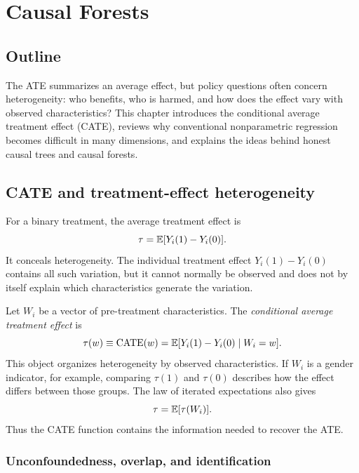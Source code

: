 \chapter{Causal Forests}
\label{chap:causal-forest}

\section*{Outline}

The ATE summarizes an average effect, but policy questions often concern
heterogeneity: who benefits, who is harmed, and how does the effect vary with
observed characteristics?  This chapter introduces the conditional average
treatment effect (CATE), reviews why conventional nonparametric regression becomes
difficult in many dimensions, and explains the ideas behind honest causal trees and
causal forests.

\section{CATE and treatment-effect heterogeneity}
\label{sec:cf-cate}

For a binary treatment, the average treatment effect is
\[
  \tau=\mathbb{E}[Y_i(1)-Y_i(0)].
\]
It conceals heterogeneity.  The individual treatment effect
$Y_i(1)-Y_i(0)$ contains all such variation, but it cannot normally be observed and
does not by itself explain which characteristics generate the variation.

Let $W_i$ be a vector of pre-treatment characteristics.  The
\emph{conditional average treatment effect} is
\begin{equation}
  \tau(w)\equiv \operatorname{CATE}(w)
  =\mathbb{E}[Y_i(1)-Y_i(0)\mid W_i=w].
  \label{eq:cf-cate}
\end{equation}
This object organizes heterogeneity by observed characteristics.  If $W_i$ is a
gender indicator, for example, comparing $\tau(1)$ and $\tau(0)$ describes how the
effect differs between those groups.  The law of iterated expectations also gives
\begin{equation}
  \tau=\mathbb{E}[\tau(W_i)].
  \label{eq:cf-ate-from-cate}
\end{equation}
Thus the CATE function contains the information needed to recover the ATE.

\subsection{Unconfoundedness, overlap, and identification}
\label{sec:cf-identification}

